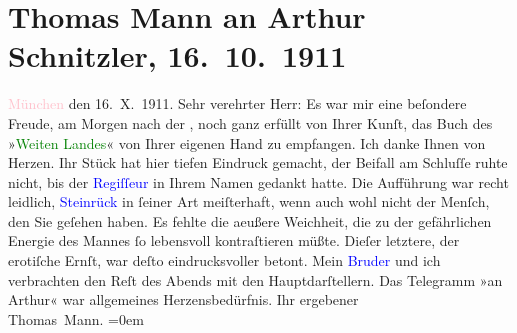 

               \section[Thomas Mann an Arthur Schnitzler, 16. 10. 1911]{ Thomas Mann an Arthur Schnitzler, 16. 10. 1911}\nopagebreak{}\rehead{ }\normalsize\beginnumbering{} \toendnotes[C]{\smallbreak\pagebreak[2]} 
\toendnotes[C]{\smallbreak}\pstart
           \raggedleft{}{\pb}\textcolor{pink}{München}{}\ledrightnote{\textcolor{pink}{München}} den
                            16. X. 1911.\pend
           \pstart{}Sehr verehrter Herr:\pend\pstart
           Es war mir eine beſondere Freude, am Morgen nach der \label{K_L02039_1v}\label{K_L02039_1h}, noch ganz erfüllt von Ihrer Kunſt, das Buch des »\textcolor{green}{Weiten Landes}{}\ledrightnote{\textcolor{green}{Das weite Land. Tragikomödie in fünf Akten}}« von Ihrer eigenen Hand zu
                    empfangen. Ich danke Ihnen von Herzen. Ihr Stück hat hier tiefen Eindruck
                    gemacht, der Beifall am Schluſſe ruhte nicht, bis der \textcolor{blue}{Regiſſeur}{} in Ihrem Namen gedankt hatte.
                    Die Aufführung war recht leidlich, \textcolor{blue}{Steinrück}{}\ledrightnote{\textcolor{blue}{Albert Steinrück}}
                    in ſeiner Art meiſter{\pb}haft, wenn auch
                    wohl nicht der Menſch, den Sie geſehen haben. Es fehlte die aeußere Weichheit,
                    die zu der gefährlichen Energie des Mannes ſo lebensvoll kontraſtieren müßte.
                    Dieſer letztere, der erotiſche Ernſt, war deſto eindrucksvoller betont. Mein \textcolor{blue}{Bruder}{} und ich verbrachten
                    den Reſt des Abends \introOben{}mit\introOben{} den Hauptdarſtellern. Das
                    Telegramm »an Arthur« war allgemeines Herzensbedürfnis.\pend
           \pstart
           Ihr ergebener{\\[\baselineskip]}\spacefill\mbox{Thomas Mann.}\pend
           \leftskip=0em{}\endnumbering{}  
      